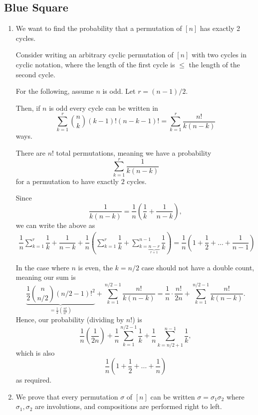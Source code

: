 \documentclass[12pt]{article}
\begin{document}
\subsection{Blue Square}
\begin{enumerate}
  \item [7] We want to find the probability that a permutation of
    $[n]$ has exactly 2 cycles.

    Consider writing an arbitrary cyclic permutation of $[n]$ with
    two cycles in cyclic notation, where the length of the first
    cycle is $\leq$ the length of the second cycle.

    For the following, assume $n$ is odd. Let $r = (n - 1)/2.$

    Then, if $n$ is odd every cycle can be written in
    $$
    \sum_{k = 1}^{r}{n \choose k} (k-1)! (n- k -1)! = \sum_{k =1
    }^{r} \dfrac{n!}{k (n - k)}
    $$
    ways.

    There are $n!$ total permutations, meaning we have a probability
    $$
    \sum_{k = 1}^{r} \dfrac{1}{k(n-k)}
    $$
    for a permutation to have exactly $2$ cycles.

    Since $$
    \dfrac{1}{k(n-k)} = \dfrac{1}{n}\left(\dfrac{1}{k} + \dfrac{1}{n -k}\right),
    $$
    we can write the above as
    \begin{align*}
      \dfrac{1}{n}\sum_{k =1 }^{r}  \dfrac{1}{k} + \dfrac{1}{n - k} +
      \dfrac{1}{n} \left( \sum_{k = 1}^{r} \dfrac{1}{k}
        + \sum_{k = \underbrace{n -r }_{r + 1}}^{n -1} \dfrac{1}{ k}
      \right)
      =  \dfrac{1}{n}\left(1 + \dfrac{1}{2} + \ldots + \dfrac{1}{n-1}\right)
    \end{align*}

    In the case where $n$ is even, the $k = n/2$ case should not have
    a double count, meaning our sum is
    $$
    \underbrace{\dfrac{1}{2}{n \choose n/2}(n/2 - 1)!^2}_{=
    \frac{1}{2}(\frac{n!}{n^2})}   + \sum_{k = 1}^{n /2 - 1}
    \dfrac{n!}{k(n-k)} = \dfrac{1}{n} \cdot \dfrac{n!}{2n} + \sum_{k
    =1 }^{n/2 - 1} \dfrac{n!}{k(n-k)}.
    $$
    Hence, our probability (dividing by $n!$) is
    $$
    \dfrac{1}{n}\left(\dfrac{1}{2n}\right) +\dfrac{1}n{} \sum_{k =
    1}^{n/2 - 1} \dfrac{1}{k} + \dfrac{1}{n}\sum_{k = n /2  +
    1}^{n-1} \dfrac{1}{k},
    $$
    which is also
    $$
    \dfrac{1}{n}\left(
      1 + \dfrac{1}{2} + \ldots + \dfrac{1}{n}
    \right)
    $$
    as required.

  \item [9] We prove that every permutation $\sigma$ of $[n]$ can be
    written $\sigma = \sigma_1 \sigma_2$ where $\sigma_1, \sigma_2$
    are involutions, and compositions are performed right to left.


\end{enumerate}
\end{document}

